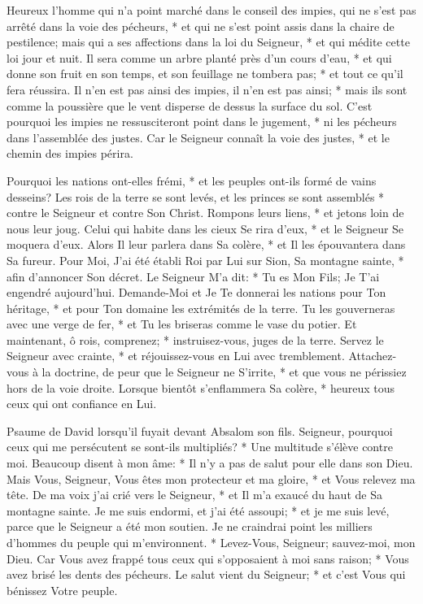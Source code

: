 
Heureux l'homme qui n'a point marché dans le conseil des impies, qui ne s'est pas arrêté dans la voie des pécheurs, * et qui ne s'est point assis dans la chaire de pestilence;
mais qui a ses affections dans la loi du Seigneur, * et qui médite cette loi jour et nuit.
Il sera comme un arbre planté près d'un cours d'eau, * et qui donne son fruit en son temps, et son feuillage ne tombera pas; * et tout ce qu'il fera réussira.
Il n'en est pas ainsi des impies, il n'en est pas ainsi; * mais ils sont comme la poussière que le vent disperse de dessus la surface du sol.
C'est pourquoi les impies ne ressusciteront point dans le jugement, * ni les pécheurs dans l'assemblée des justes.
Car le Seigneur connaît la voie des justes, * et le chemin des impies périra.

Pourquoi les nations ont-elles frémi, * et les peuples ont-ils formé de vains desseins?
Les rois de la terre se sont levés, et les princes se sont assemblés * contre le Seigneur et contre Son Christ.
Rompons leurs liens, * et jetons loin de nous leur joug.
Celui qui habite dans les cieux Se rira d'eux, * et le Seigneur Se moquera d'eux.
Alors Il leur parlera dans Sa colère, * et Il les épouvantera dans Sa fureur.
Pour Moi, J'ai été établi Roi par Lui sur Sion, Sa montagne sainte, * afin d'annoncer Son décret.
Le Seigneur M'a dit: * Tu es Mon Fils; Je T'ai engendré aujourd'hui.
Demande-Moi et Je Te donnerai les nations pour Ton héritage, * et pour Ton domaine les extrémités de la terre.
Tu les gouverneras avec une verge de fer, * et Tu les briseras comme le vase du potier.
Et maintenant, ô rois, comprenez; * instruisez-vous, juges de la terre.
Servez le Seigneur avec crainte, * et réjouissez-vous en Lui avec tremblement.
Attachez-vous à la doctrine, de peur que le Seigneur ne S'irrite, * et que vous ne périssiez hors de la voie droite.
Lorsque bientôt s'enflammera Sa colère, * heureux tous ceux qui ont confiance en Lui.

Psaume de David lorsqu'il fuyait devant Absalom son fils.
Seigneur, pourquoi ceux qui me persécutent se sont-ils multipliés? * Une multitude s'élève contre moi.
Beaucoup disent à mon âme: * Il n'y a pas de salut pour elle dans son Dieu.
Mais Vous, Seigneur, Vous êtes mon protecteur et ma gloire, * et Vous relevez ma tête.
De ma voix j'ai crié vers le Seigneur, * et Il m'a exaucé du haut de Sa montagne sainte.
Je me suis endormi, et j'ai été assoupi; * et je me suis levé, parce que le Seigneur a été mon soutien.
Je ne craindrai point les milliers d'hommes du peuple qui m'environnent. * Levez-Vous, Seigneur; sauvez-moi, mon Dieu.
Car Vous avez frappé tous ceux qui s'opposaient à moi sans raison; * Vous avez brisé les dents des pécheurs.
Le salut vient du Seigneur; * et c'est Vous qui bénissez Votre peuple.

